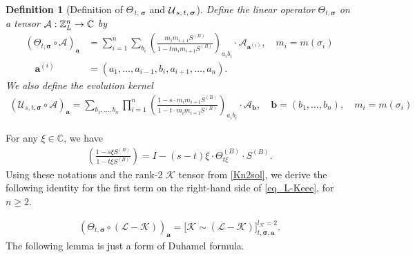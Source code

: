 \documentclass[10pt,reqno]{article}
\theoremstyle{plain} %
\newtheorem{definition}[theorem]{Definition}
\theoremstyle{remark}
\numberwithin{equation}{section}
\begin{document}
\begin{definition}[Definition of ${\varTheta}_{\,t, \,\boldsymbol{\sigma}}$ and ${\cal U}_{\,s,\, t, \,\boldsymbol{\sigma}}$]\label{DefTHUST}
Define the linear operator ${\varTheta}_{t, \boldsymbol{\sigma}}$ on a tensor ${\cal A}: \mathbb Z^n_L\to \mathbb C$ by 
\begin{align}
    \left({{\varTheta}}_{t, \boldsymbol{\sigma}} \circ \mathcal{A}\right)_{\textbf{a}} & = \sum_{i=1}^n \sum_{b_i} \left(\frac{m_i m_{i+1} S^{(B)} }{1 - t m_i m_{i+1} S^{(B)}}\right)_{a_i b_i} \cdot \mathcal{A}_{\textbf{a}^{(i)}},\quad m_i=m(\sigma_i) \nonumber \\
    \quad \textbf{a}^{(i)}&  = (a_1, \ldots, a_{i-1}, b_i, a_{i+1}, \ldots, a_n).
\end{align}  
We also define the evolution kernel 
    \begin{align}\label{def_Ustz}
        \left(\mathcal{U}_{s, t, \boldsymbol{\sigma}} \circ \mathcal{A}\right)_{\textbf{a}} = \sum_{b_1, \ldots, b_n} \prod_{i=1}^n \left(\frac{1 - s \cdot m_i m_{i+1} S^{(B)}}{1 - t \cdot m_i m_{i+1} S^{(B)}}\right)_{a_i b_i} \cdot \mathcal{A}_{\textbf{b}}, \quad \textbf{b} = (b_1, \ldots, b_n), \quad m_i=m(\sigma_i)
    \end{align}
\end{definition}
For any $\xi \in \mathbb{C}$, we have 
 \begin{align}\label{def_Ustz_2}
\left(\frac{1 - s \xi S^{(B)}}{1 - t \xi S^{(B)}}\right) = I - (s - t) \xi \cdot \Theta^{(B)}_{t \xi} \cdot S^{(B)}.
\end{align}
Using these notations and the rank-2 $\mathcal{K}$ tensor from \eqref{Kn2sol}, we derive the following identity for the first term on the right-hand side of \eqref{eq_L-Keee}, for $n\ge 2$.

\begin{align}
    \left({\varTheta}_{t, \boldsymbol{\sigma}} \circ (\mathcal{L} - \mathcal{K})\right)_{\textbf{a}} = \Big[\mathcal{K} \sim (\mathcal{L} - \mathcal{K})\Big]^{l_\mathcal{K} = 2}_{t, \boldsymbol{\sigma}, \textbf{a}}.
\end{align}
 The following lemma is just a form of  Duhamel formula. 
\end{document}

